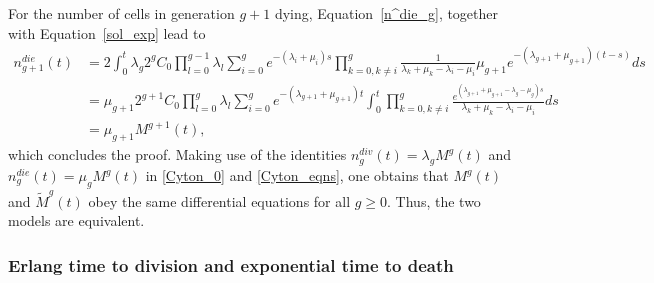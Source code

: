 \documentclass[10pt]{article}
\numberwithin{equation}{section}
\begin{document}
For the number of cells in generation $g+1$ dying, Equation~\eqref{n^die_g}, together with Equation~\eqref{sol_exp} lead to
\begin{align*}
    n^{die}_{g+1}(t) & =
    2 \int_0^t \lambda_g 
    2^g C_0 \prod_{l=0}^{g-1} \lambda_l \sum_{i=0}^g e^{-(\lambda_i + \mu_i)s} \prod_{k=0, k \neq i}^g \frac{1}{\lambda_k+\mu_k-\lambda_i-\mu_i}
    \mu_{g+1} e^{-(\lambda_{g+1} + \mu_{g+1})(t-s)} ds \\
    & = \mu_{g+1} 2^{g+1} C_0 \prod_{l=0}^g \lambda_l \sum_{i=0}^g 
    e^{-(\lambda_{g+1} + \mu_{g+1})t} \int_0^t 
    \prod_{k=0, k \neq i}^g
    \frac{e^{(\lambda_{g+1} + \mu_{g+1} - \lambda_g -\mu_g)s}}{\lambda_k+\mu_k-\lambda_i-\mu_i} ds \\
    & = \mu_{g+1} M^{g+1}(t),
\end{align*}
which concludes the proof. Making use of the identities $n^{div}_{g}(t) = \lambda_g M^g(t)$ and $n^{die}_{g}(t) = \mu_g M^g(t)$ in \eqref{Cyton_0} and \eqref{Cyton_eqns}, one obtains that $M^g(t)$ and ${\widetilde M}^g(t)$ obey the same differential equations for all $g \ge 0$. Thus, the two models are equivalent.

\subsubsection{Erlang time to division and exponential time to death} 
\end{document}
